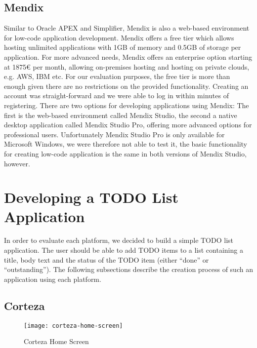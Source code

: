 \documentclass[runningheads]{llncs}
\begin{document}
\subsection{Mendix}

Similar to Oracle APEX and Simplifier, Mendix is also a web-based environment for low-code application development. Mendix offers a free tier which allows hosting unlimited applications with 1GB of memory and 0.5GB of storage per application. For more advanced needs, Mendix offers an enterprise option starting at 1875€ per month, allowing on-premises hosting and hosting on private clouds, e.g. AWS, IBM etc. For our evaluation purposes, the free tier is more than enough given there are no restrictions on the provided functionality. Creating an account was straight-forward and we were able to log in within minutes of registering. There are two options for developing applications using Mendix: The first is the web-based environment called Mendix Studio, the second a native desktop application called Mendix Studio Pro, offering more advanced options for professional users. Unfortunately Mendix Studio Pro is only available for Microsoft Windows, we were therefore not able to test it, the basic functionality for creating low-code application is the same in both versions of Mendix Studio, however.

\section{Developing a TODO List Application}
\label{sec:developing_a_todo_list_application}

In order to evaluate each platform, we decided to build a simple TODO list application. The user should be able to add TODO items to a list containing a title, body text and the status of the TODO item (either “done” or “outstanding”). The following subsections describe the creation process of such an application using each platform.

\subsection{Corteza}

\begin{figure}
  \centering
  \texttt{[image: corteza-home-screen]}
  \caption{Corteza Home Screen}
  \label{fig:corteza_home_screen}
\end{figure}
\end{document}
